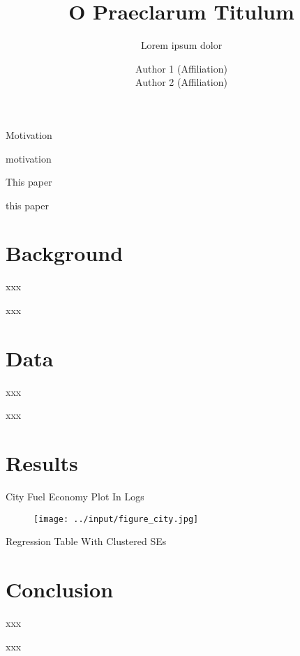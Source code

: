 \documentclass[10pt,t,aspectratio=169]{beamer}
\title{O Praeclarum Titulum}
\subtitle{Lorem ipsum dolor}
\date{}
\author{Author 1 (Affiliation) \\
        Author 2 (Affiliation)}
\begin{document}
\maketitle

\begin{frame}{Motivation}

    motivation

\end{frame}

\begin{frame}{This paper}

    this paper
  
\end{frame}

\section{Background}

\begin{frame}{xxx}

    xxx
  
\end{frame}

\section{Data}

\begin{frame}{xxx}

    xxx
  
\end{frame}

\section{Results}

\begin{frame}{ City Fuel Economy Plot In Logs}

	\begin{figure}[!htp]
    		\centering
   	 	\caption{\bf{}}
   		 \texttt{[image: ../input/figure\_city.jpg]}
	\end{figure}
  
\end{frame}

\begin{frame}{Regression Table With Clustered SEs}
  \centering
  \resizebox{\textwidth}{!}{}
\end{frame}


\section{Conclusion}

\begin{frame}{xxx}

    xxx
  
\end{frame}
\end{document}
